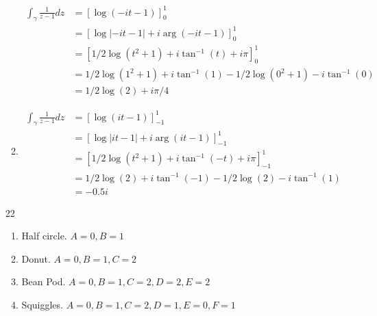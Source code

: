 \documentclass{article}
\begin{document}
\begin{enumerate}
\begin{enumerate}[label=(\roman*)]
\begin{align*}
            \int_{\gamma}\frac{1}{z-1}dz&=[\log(-it-1)]_0^1\\
            &=[\log|-it-1|+i\arg(-it-1)]_0^1\\
            &=[1/2\log(t^2+1)+i\tan^{-1}(t)+i\pi]_0^1\\
            &=1/2\log(1^2+1)+i\tan^{-1}(1)-1/2\log(0^2+1)-i\tan^{-1}(0)\\
            &=1/2\log(2)+i\pi/4
          \end{align*}
        \item
          \begin{align*}
            \int_{\gamma}\frac{1}{z-1}dz&=[\log(it-1)]_{-1}^1\\
            &=[\log|it-1|+i\arg(it-1)]_{-1}^1\\
            &=[1/2\log(t^2+1)+i\tan^{-1}(-t)+i\pi]_{-1}^1\\
            &=1/2\log(2)+i\tan^{-1}(-1)-1/2\log(2)-i\tan^{-1}(1)\\
            &=-0.5i
          \end{align*}
      \end{enumerate}
    \item[22]
      \begin{enumerate}[label=(\roman*)]
        \item Half circle. $A=0,B=1$
        \item Donut. $A=0, B=1, C=2$
        \item Bean Pod. $A=0, B=1, C=2, D=2, E=2$
        \item Squiggles. $A=0, B=1, C=2, D=1, E=0, F=1$
      \end{enumerate}
  \end{enumerate}
\end{document}
